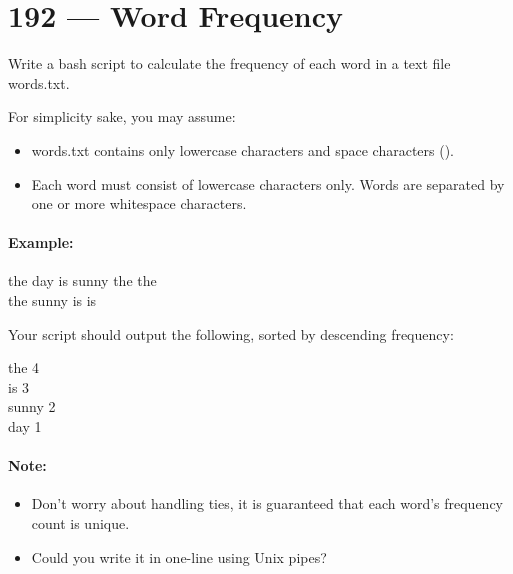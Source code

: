 \section{192 --- Word Frequency}
Write a bash script to calculate the frequency of each word in a text file words.txt.
\par
For simplicity sake, you may assume:
\begin{itemize}
\item words.txt contains only lowercase characters and space characters (\textvisiblespace).
\item Each word must consist of lowercase characters only.
Words are separated by one or more whitespace characters.
\end{itemize}
\paragraph{Example:}
\begin{flushleft}
\begin{mdframed}[style=mymdf]
the day is sunny the the
\\
the sunny is is
\end{mdframed}
Your script should output the following, sorted by descending frequency:
\begin{mdframed}[style=mymdf]
the 4
\\
is 3
\\
sunny 2
\\
day 1
\end{mdframed}
\end{flushleft}
\paragraph{Note:}
\begin{itemize}
\item Don't worry about handling ties, it is guaranteed that each word's frequency count is unique.
\item Could you write it in one-line using Unix pipes?
\end{itemize}
